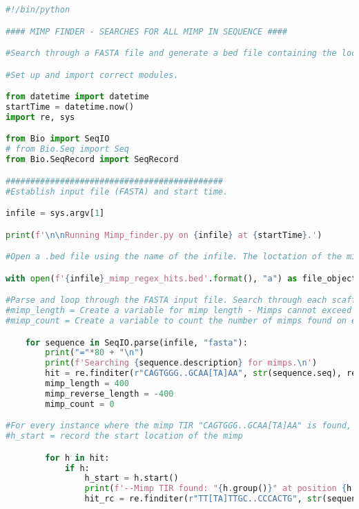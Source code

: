 \begin{lstlisting}[language=Python, caption= Regex based \textit{mimp} searching script.]
#!/bin/python

#### MIMP FINDER - SEARCHES FOR ALL MIMP IN SEQUENCE ####

#Search through a FASTA file and generate a bed file containing the location of mimps.

#Set up and import correct modules.

from datetime import datetime
startTime = datetime.now()
import re, sys

from Bio import SeqIO
# from Bio.Seq import Seq
from Bio.SeqRecord import SeqRecord

############################################
#Establish input file (FASTA) and start time.

infile = sys.argv[1]

print(f'\n\nRunning Mimp_finder.py on {infile} at {startTime}.')

#Open a .bed file using the name of the infile. The loctation of the mimp finder will be desposited within.

with open(f'{infile}_mimp_regex_hits.bed'.format(), "a") as file_object:

#Parse and loop through the FASTA input file. Search through each scaffold/contig of the FASTA looking for sequences which match the regex/mimp TIR "CAGTGGG..GCAA[TA]AA" (re.IGNORECASE remove case sensitivity issues).
#mimp_length = Create a variable for mimp length - Mimps cannot exceed 400 nucleotides.
#mimp_count = Create a variable to count the number of mimps found on each contid/scaffold.

    for sequence in SeqIO.parse(infile, "fasta"):
        print("="*80 + "\n")
        print(f'Searching {sequence.description} for mimps.\n')
        hit = re.finditer(r"CAGTGGG..GCAA[TA]AA", str(sequence.seq), re.IGNORECASE)
        mimp_length = 400
        mimp_reverse_length = -400
        mimp_count = 0

#For every instance where the mimp TIR "CAGTGGG..GCAA[TA]AA" is found, print the location of the hit and search that contig for the other mimp TIR.
#h_start = record the start location of the mimp

        for h in hit:
            if h:
                h_start = h.start()
                print(f'--Mimp TIR found: "{h.group()}" at position {h.start()} to {h.end()}--')
                hit_rc = re.finditer(r"TT[TA]TTGC..CCCACTG", str(sequence.seq), re.IGNORECASE)


\end{lstlisting}
